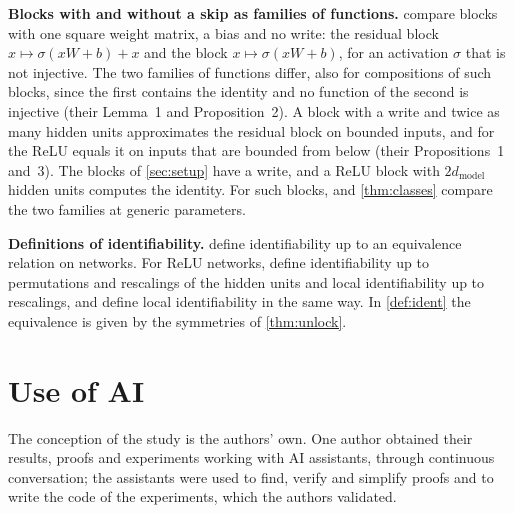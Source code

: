 \documentclass[10pt]{article}
\theoremstyle{definition}
\theoremstyle{remark}
\newcommand{\dm}{d_{\mathrm{model}}}
\newcommand{\para}[1]{\smallskip\noindent\textbf{#1}\hspace{0.5em}}
\begin{document}
\para{Blocks with and without a skip as families of functions.} \citet{mehmeti2025resnets} compare blocks with one square weight matrix, a bias and no write: the residual block $x \mapsto \sigma(xW + b) + x$ and the block $x \mapsto \sigma(xW + b)$, for an activation $\sigma$ that is not injective. The two families of functions differ, also for compositions of such blocks, since the first contains the identity and no function of the second is injective (their Lemma~1 and Proposition~2). A block with a write and twice as many hidden units approximates the residual block on bounded inputs, and for the ReLU equals it on inputs that are bounded from below (their Propositions~1 and~3). The blocks of \cref{sec:setup} have a write, and a ReLU block with $2\dm$ hidden units computes the identity. For such blocks, \citet{mijoski2026worth} and \cref{thm:classes} compare the two families at generic parameters.

\para{Definitions of identifiability.} \citet{vlacic2020affine} define identifiability up to an equivalence relation on networks. For ReLU networks, \citet{stock2021embedding} define identifiability up to permutations and rescalings of the hidden units and local identifiability up to rescalings, and \citet{bonapellissier2022local} define local identifiability in the same way. In \cref{def:ident} the equivalence is given by the symmetries of \cref{thm:unlock}.

\section*{Use of AI}
The conception of the study is the authors' own. One author obtained their results, proofs and experiments working with AI assistants, through continuous conversation; the assistants were used to find, verify and simplify proofs and to write the code of the experiments, which the authors validated.
\end{document}

